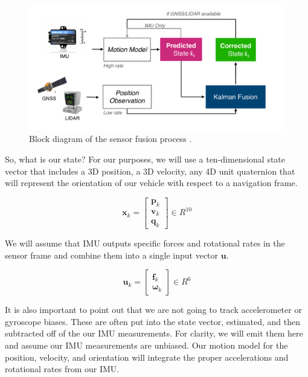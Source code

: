 \begin{figure}[!htb]
\begin{center}
\includegraphics[scale=0.280]{img/sensor_fusion/ekf_sensor_fusion.jpeg}
\end{center}
\caption{Block diagram of the sensor fusion process .}
\label{ekf_sensor_fusion}
\end{figure}

So, what is our state? For our purposes, we will use a ten-dimensional
state vector that includes a 3D position, a 3D velocity, any 4D unit
quaternion that will represent the orientation of our vehicle with respect to a navigation frame. 

\begin{equation}
\mathbf{x}_k = 
\begin{bmatrix}
\mathbf{p}_k \\
\mathbf{v}_k \\
\mathbf{q}_k 
\end{bmatrix} \in R^{10}
\end{equation}


We will assume that IMU outputs specific forces and rotational rates in the sensor frame and combine them into a single
input vector $\mathbf{u}$. 

\begin{equation}
\mathbf{u}_k =
\begin{bmatrix}
\mathbf{f}_k \\
\mathbf{\omega}_k
\end{bmatrix} \in R^6
\end{equation}

It is also important to point out that we are not going to track accelerometer
or gyroscope biases. These are often put into the state vector, estimated, and then subtracted off of the our IMU
measurements. For clarity, we will emit them here and assume our IMU measurements
are unbiased. Our motion model for the position, velocity, and orientation
will integrate the proper accelerations and rotational rates
from our IMU. 

